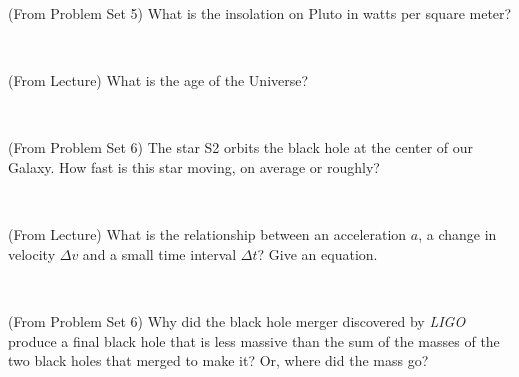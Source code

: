 \documentclass[12pt, letterpaper]{article}
\begin{document}
\begin{problem}
(From Problem Set 5)
What is the insolation on Pluto in watts per square meter?
\end{problem}

\vfill ~

\clearpage

\begin{problem}
(From Lecture)
What is the age of the Universe?
\end{problem}

\vfill ~

\begin{problem}
(From Problem Set 6)
The star S2 orbits the black hole at the center of our Galaxy.
How fast is this star moving, on average or roughly?
\end{problem}

\vfill ~

\begin{problem}
(From Lecture)
What is the relationship between an acceleration $a$, a change in velocity $\Delta v$ and a small time interval $\Delta t$? Give an equation.
\end{problem}

\vfill ~

\begin{problem}
(From Problem Set 6)
Why did the black hole merger discovered by \textsl{LIGO} produce a final black hole that is less massive than the sum of the masses of the two black holes that merged to make it? Or, where did the mass go?
\end{problem}

\vfill ~
\end{document}
